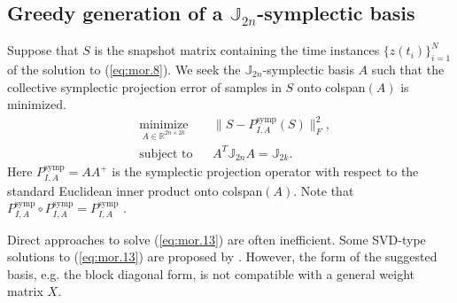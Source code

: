 \subsection{Greedy generation of a $\mathbb J_{2n}$-symplectic basis} \label{sec:mor.3}
Suppose that $S$ is the snapshot matrix containing the time instances $\{z(t_i)\}_{i=1}^N$ of the solution to (\ref{eq:mor.8}). We seek the $\mathbb J_{2n}$-symplectic basis $A$ such that the collective symplectic projection error of samples in $S$ onto colspan$(A)$ is minimized.
\begin{equation} \label{eq:mor.13}
\begin{aligned}
& \underset{A\in \mathbb{R}^{2n\times 2k}}{\text{minimize}}
& & \| S - P^\text{symp}_{I,A}(S) \|_F^2, \\
& \text{subject to}
& & A^T\mathbb J_{2n}A = \mathbb J_{2k}.
\end{aligned}
\end{equation}
Here $P^\text{symp}_{I,A} = AA^+$ is the symplectic projection operator with respect to the standard Euclidean inner product onto colspan$(A)$. Note that $P^\text{symp}_{I,A} \circ P^\text{symp}_{I,A} = P^\text{symp}_{I,A}$ \cite{doi:10.1137/140978922,doi:10.1137/17M1111991}.

Direct approaches to solve (\ref{eq:mor.13}) are often inefficient. Some SVD-type solutions to (\ref{eq:mor.13}) are proposed by \cite{doi:10.1137/140978922}. However, the form of the suggested basis, e.g. the block diagonal form, is not compatible with a general weight matrix $X$. 

